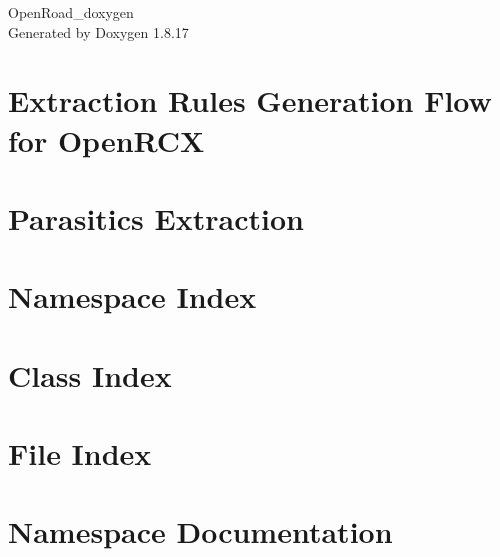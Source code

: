 \let\mypdfximage\pdfximage\def\pdfximage{\immediate\mypdfximage}\documentclass[twoside]{book}
\newcommand{\+}{\discretionary{\mbox{\scriptsize$\hookleftarrow$}}{}{}}
\newcommand{\clearemptydoublepage}{%
  \newpage{\pagestyle{empty}\cleardoublepage}%
}
\begin{document}
\hypersetup{pageanchor=false,
             bookmarksnumbered=true,
             pdfencoding=unicode
            }
\begin{titlepage}
\vspace*{7cm}
\begin{center}%
{\Large Open\+Road\+\_\+doxygen }\\
\vspace*{1cm}
{\large Generated by Doxygen 1.8.17}\\
\end{center}
\end{titlepage}
\clearemptydoublepage
{}
\tableofcontents
\clearemptydoublepage
{}
\hypersetup{pageanchor=true}

\chapter{Extraction Rules Generation Flow for Open\+R\+CX}
\label{md__ext_ssd__open_r_o_a_d__open_r_o_a_d_src_rcx_doc_calibration}

\chapter{Parasitics Extraction}
\label{md__ext_ssd__open_r_o_a_d__open_r_o_a_d_src_rcx__r_e_a_d_m_e}

\chapter{Namespace Index}

\chapter{Class Index}

\chapter{File Index}

\chapter{Namespace Documentation}
















\end{document}
